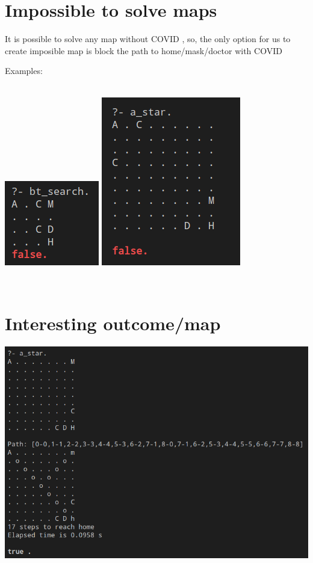 \documentclass{article}
\newcommand{\C}{COVID }
\begin{document}
\section{Impossible to solve maps}

It is possible to solve any map without \C, so, the only option for us to create imposible map is block the path to home/mask/doctor with \C

Examples:

\\

\includegraphics[scale=1.7]{impossible_map_1.png}
\includegraphics[scale=0.9]{impossible_map_2.png}

\\

\section{Interesting outcome/map}

\includegraphics[scale=0.85]{interesting_map.png}
\end{document}

